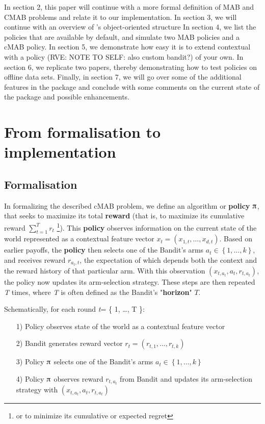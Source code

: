 \documentclass[nojss]{jss}\usepackage[]{graphicx}\usepackage[]{color}
\begin{document}
In section 2, this paper will continue with a more formal definition of MAB and CMAB problems and relate it to our implementation. In section 3, we will continue with an overview of ’s object-oriented structure In section 4, we list the policies that are available by default, and simulate two MAB policies and a cMAB policy. In section 5, we demonstrate how easy it is to extend contextual with a policy (RVE: NOTE TO SELF: also custom bandit?) of your own. In section 6, we replicate two papers, thereby demonstrating how to test policies on offline data sets. Finally, in section  7, we will go over some of the additional features in the package and conclude with some comments on the current state of the package and possible enhancements.






\section{From formalisation to implementation}


\subsection{Formalisation}

In formalizing the described cMAB problem, we define an algorithm or \textbf{policy} $\piup$, that seeks to maximize its total \textbf{reward} (that is, to maximize its cumulative reward $\sum_{t=1}^T r_t$ \footnote{or to minimize its cumulative or expected regret}). This \textbf{policy} observes information on the current state of the world represented as a contextual feature vector \(x_{t}=\left( x_{1,t},  \dots, x_{d,t}\right)\). Based on earlier payoffs, the \textbf{policy} then selects one of the Bandit's arms \(a_{t} \in \left\{ 1, \dots, k \right\}\), and receives reward \(r_{a_{t},t}\), the expectation of which depends both the context and the reward history of that particular arm. With this observation \( (x_{t,a_t},a_{t},r_{t,a_t}) \), the policy now updates its arm-selection strategy. These steps are then repeated \textit{T} times, where \textit{T} is often defined as the Bandit's "\textbf{horizon}" $T$.

Schematically, for each round \emph{t}= \{ 1, \ldots, T \}:

\begin{enumerate}
         \item[1)] Policy observes state of the world as a contextual feature vector
         \item[2)] Bandit generates reward vector \(r_{t}=\left( r_{t,1},  \dots, r_{t,k}\right)\)
         \item[3)] Policy $\piup$ selects one of the Bandit's arms \(a_{t} \in \left\{ 1, \dots, k \right\}\)
         \item[4)] Policy $\piup$ observes reward \(r_{t,a_t}\) from Bandit and updates its arm-selection strategy with \( (x_{t,a_t},a_{t},r_{t,a_t}) \)
\end{enumerate}
\end{document}

